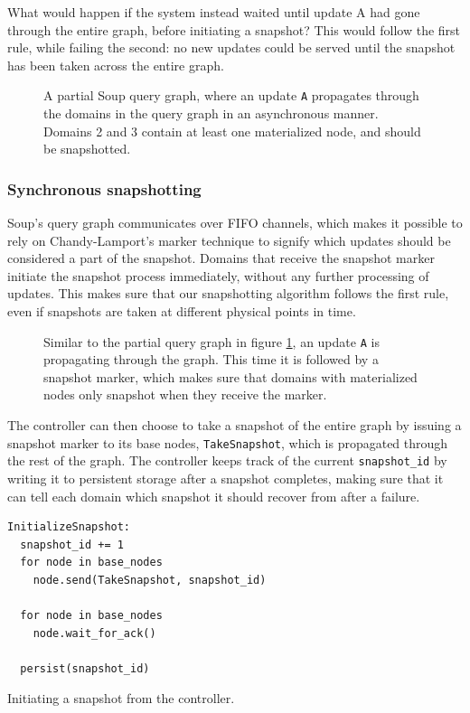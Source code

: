 \documentclass[b5paper]{report}
\begin{document}
What would happen if the system instead waited until update A had gone through
the entire graph, before initiating a snapshot? This would follow the first
rule, while failing the second: no new updates could be served until the
snapshot has been taken across the entire graph.

\begin{figure}[H]
  \centering
  
  \caption{
    A partial Soup query graph, where an update \texttt{A} propagates through
    the domains in the query graph in an asynchronous manner. Domains 2 and 3
    contain at least one materialized node, and should be snapshotted.
    \label{bad-example}
  }
\end{figure}

\subsubsection{Synchronous snapshotting}
Soup's query graph communicates over FIFO channels, which makes it possible to
rely on Chandy-Lamport's marker technique to signify which updates should be
considered a part of the snapshot. Domains that receive the snapshot marker
initiate the snapshot process immediately, without any further processing of
updates. This makes sure that our snapshotting algorithm follows the first rule,
even if snapshots are taken at different physical points in time.

\begin{figure}[H]
  \centering
  
  \caption{
    Similar to the partial query graph in figure \ref{bad-example}, an update
    \texttt{A} is propagating through the graph. This time it is followed by a
    snapshot marker, which makes sure that domains with materialized
    nodes only snapshot when they receive the marker.
    \label{good-example}
  }
\end{figure}

The controller can then choose to take a snapshot of the entire graph by issuing
a snapshot marker to its base nodes, \texttt{TakeSnapshot}, which is propagated
through the rest of the graph. The controller keeps track of the current
\texttt{snapshot\_id} by writing it to persistent storage after a snapshot
completes, making sure that it can tell each domain which snapshot it should
recover from after a failure.

\begin{listing}[H]
  \begin{verbatim}
InitializeSnapshot:
  snapshot_id += 1
  for node in base_nodes
    node.send(TakeSnapshot, snapshot_id)

  for node in base_nodes
    node.wait_for_ack()

  persist(snapshot_id)
  \end{verbatim}

  \caption{Initiating a snapshot from the controller.}
\end{listing}
\end{document}

